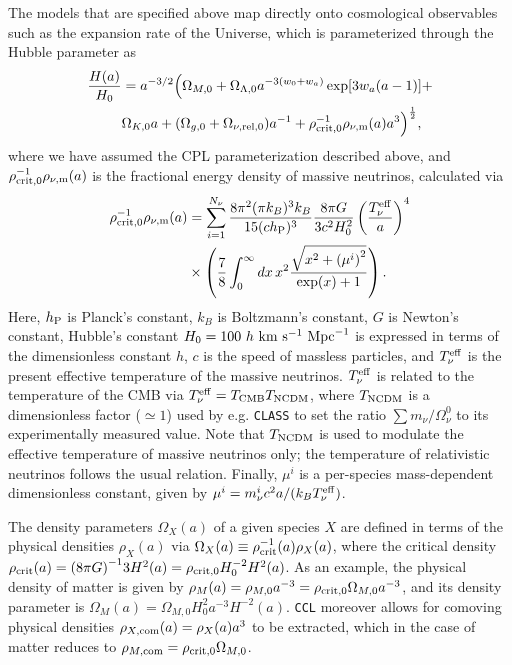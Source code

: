 \documentclass[\docopts]{\docclass}
\newcommand{\ccl}{{\tt CCL}\xspace}
\begin{document}
The models that are specified above map directly onto cosmological observables such as the expansion rate of the Universe, which is parameterized through the Hubble parameter as
\begin{align}\label{eq:Ha}
\frac{H(a)}{H_0} &= a^{-3/2}\Big(\Omega_{M,0}+\Omega_{\Lambda,0} a^{-3(w_0+w_a)}
    \exp[3 w_a (a-1)]+\nonumber \\ &\Omega_{K,0} a +(\Omega_{g,0} + \Omega_{\nu, {\rm rel},0}) a^{-1} + \rho^{-1}_{\rm crit,0} \rho_{\nu, {\rm m}}(a)a^3\Big)^{\frac{1}{2}} ,
\end{align}
where we have assumed the CPL parameterization described above, and
$\rho^{-1}_{\rm crit,0} \rho_{\nu, {\rm m}}(a)$ is the fractional energy density of massive neutrinos, calculated via
\begin{align}
\rho^{-1}_{\rm crit,0} \rho_{\nu, {\rm m}}(a) &= \sum_{i=1}^{N_\nu} \frac{8 \pi^2(\pi k_B )^3 k_B}{15(c h_{\rm P})^3} \frac{8 \pi G}{3c^2H_0^2} \left(\frac{T_{\nu}^{\rm eff}}{a}\right)^4 \nonumber \\ & \times \left(\frac{7}{8}\int_0^{\infty} dx \, x^2 \frac{\sqrt{x^2 + \left(\mu^i\right)^2}}{\exp(x) + 1}\right).
\label{Omnu}
\end{align}
Here, $h_{\rm P}$ is Planck's constant, $k_B$ is Boltzmann's constant, $G$ is Newton's constant, Hubble's constant $H_0 = 100~h~{\rm km}~{\rm s}^{-1}~{\rm Mpc}^{-1}$ is expressed in terms of the dimensionless constant $h$, $c$ is the speed of massless particles, and $T_{\nu}^{\rm eff}$ is the present effective temperature of the massive neutrinos. $T_{\nu}^{\rm eff}$ is related to the temperature of the CMB via $T_{\nu}^{\rm eff} = T_{\rm CMB} T_{\rm NCDM}$, where $T_{\rm NCDM}$ is a dimensionless factor ($\simeq1$) used by e.g. {\tt CLASS} to set the ratio ${\sum m_\nu}/{\Omega_{\nu}^0}$ to its experimentally measured value. Note that $T_{\rm NCDM}$ is used to modulate the effective temperature of massive neutrinos only; the temperature of relativistic neutrinos follows the usual relation. Finally, $\mu^i$ is a per-species mass-dependent dimensionless constant, given by $\mu^i = m_{\nu}^{i}c^2 a / (k_B T_{\nu}^{\rm eff})$.

The density parameters $\Omega_X(a)$ of a given species $X$ are defined in terms of the physical densities $\rho_X(a)$ via $\Omega_X(a) \equiv \rho^{-1}_{\rm crit}(a) \rho_X(a)$, where the critical density $\rho_{\rm crit}(a) = {( 8 \pi G)}^{-1} 3H^2(a) = \rho_{\rm crit,0} H_0^{-2} H^2(a)$. As an example, the physical density of matter is given by $\rho_M(a) = \rho_{M,0} a^{-3} = \rho_{\rm crit,0} \Omega_{M,0} a^{-3}$, and its density parameter is $\Omega_M(a) = \Omega_{M,0} H_0^{2} a^{-3} H^{-2}(a)$. \ccl moreover allows for comoving physical densities $\rho_{X, {\rm com}}(a) = \rho_X(a) a^3$ to be extracted, which in the case of matter reduces to $\rho_{M, {\rm com}} = \rho_{\rm crit,0} \Omega_{M,0}$.
\end{document}
